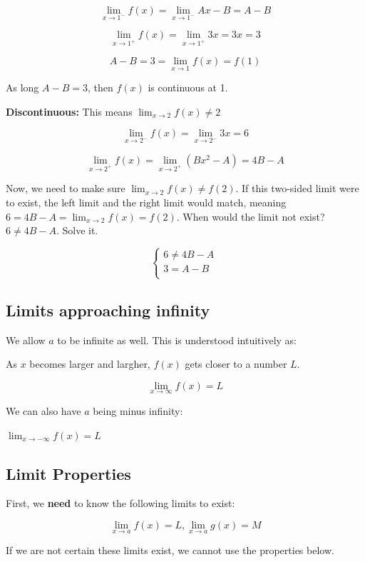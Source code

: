 \documentclass[12pt]{article}
\theoremstyle{plain}
\theoremstyle{remark}
\theoremstyle{definition}
\begin{document}
\[\lim_{x \rightarrow 1^{-}}{f(x)} = \lim_{x \rightarrow 1^{-}}{Ax - B} = A - B\]

\[\lim_{x \rightarrow 1^{+}}{f(x)} = \lim_{x \rightarrow 1^{+}}{3x} = 3x = 3\]

\[A - B = 3 = \lim_{x \rightarrow 1}{f(x) = f(1)}\]

As long \(A - B = 3\), then \(f(x)\) is continuous at 1.

\textbf{Discontinuous:} This means
\(\lim_{x \rightarrow 2}{f(x) \neq 2}\)

\[\lim_{x \rightarrow 2^{-}}{f(x) =}\lim_{x \rightarrow 2^{-}}3x = 6\]

\[\lim_{x \rightarrow 2^{+}}{f(x) = \lim_{x \rightarrow 2^{+}}(Bx^{2} - A)} = 4B - A\]

Now, we need to make sure \(\lim_{x \rightarrow 2}{f(x)} \neq f(2)\). If
this two-sided limit were to exist, the left limit and the right limit
would match, meaning
\(6 = 4B - A = \lim_{x \rightarrow 2}{f(x)} = f(2)\). When would the
limit not exist? \(6 \neq 4B - A\). Solve it.

\[\left\{ \begin{matrix}
6 \neq 4B - A \\
3 = A - B \\
\end{matrix} \right.\ \]


\subsection{Limits approaching
infinity}

We allow \(a\) to be infinite as well. This is understood intuitively
as:

As \(x\) becomes larger and largher, \(f(x)\) gets closer to a number
\(L\).

\[\lim_{x \rightarrow \infty}{f(x) = L}\]

We can also have \(a\) being minus infinity:

\(\lim_{x \rightarrow - \infty}{f(x) = L}\)


\subsection{Limit Properties}

First, we \textbf{need} to know the following limits to exist:

\[\lim_{x \rightarrow a}{f(x) = L},\lim_{x \rightarrow a}{g(x) = M}\]

If we are not certain these limits exist, we cannot use the properties
below.
\end{document}
